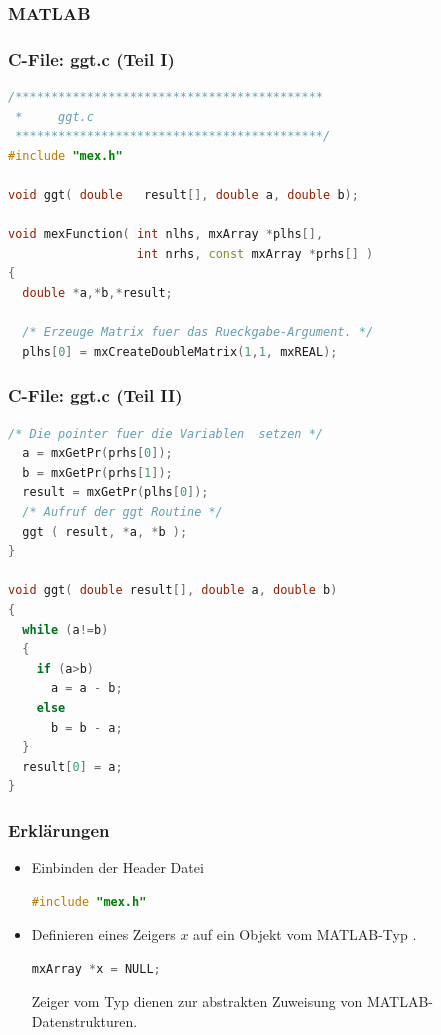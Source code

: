 \documentclass[hyperref={xetex}]{beamer}
\begin{document}
\begin{frame}[fragile]\frametitle{MATLAB}

\end{frame}
%
% 
\begin{frame}[fragile]\frametitle{C-File: ggt.c (Teil I)}
\begin{lstlisting}[language=C++]
/*******************************************
 *     ggt.c  
 *******************************************/
#include "mex.h"

void ggt( double   result[], double a, double b);

void mexFunction( int nlhs, mxArray *plhs[],
                  int nrhs, const mxArray *prhs[] )
{
  double *a,*b,*result;
  
  /* Erzeuge Matrix fuer das Rueckgabe-Argument. */
  plhs[0] = mxCreateDoubleMatrix(1,1, mxREAL);  
\end{lstlisting}
\end{frame}
%
% 
\begin{frame}[fragile]\frametitle{C-File: ggt.c (Teil II)}
\begin{lstlisting}[language=C++]
  /* Die pointer fuer die Variablen  setzen */
  a = mxGetPr(prhs[0]);
  b = mxGetPr(prhs[1]);
  result = mxGetPr(plhs[0]);  
  /* Aufruf der ggt Routine */
  ggt ( result, *a, *b );
}

void ggt( double result[], double a, double b)
{
  while (a!=b)
  {
    if (a>b) 
      a = a - b;
    else
      b = b - a;      
  }
  result[0] = a;
}
\end{lstlisting}
\end{frame}
%
% 
\begin{frame}[fragile]\frametitle{Erkl\"arungen}
\begin{itemize}
\item Einbinden der Header Datei
\begin{lstlisting}[language=C++]
#include "mex.h"
\end{lstlisting}
\item Definieren eines Zeigers $x$ auf ein Objekt vom MATLAB-Typ . 
\begin{lstlisting}[language=C++]
 mxArray *x = NULL;
\end{lstlisting}
Zeiger vom Typ  dienen zur abstrakten Zuweisung von MATLAB-Datenstrukturen.
\end{itemize}
\end{frame}
%
% 
\end{document}
